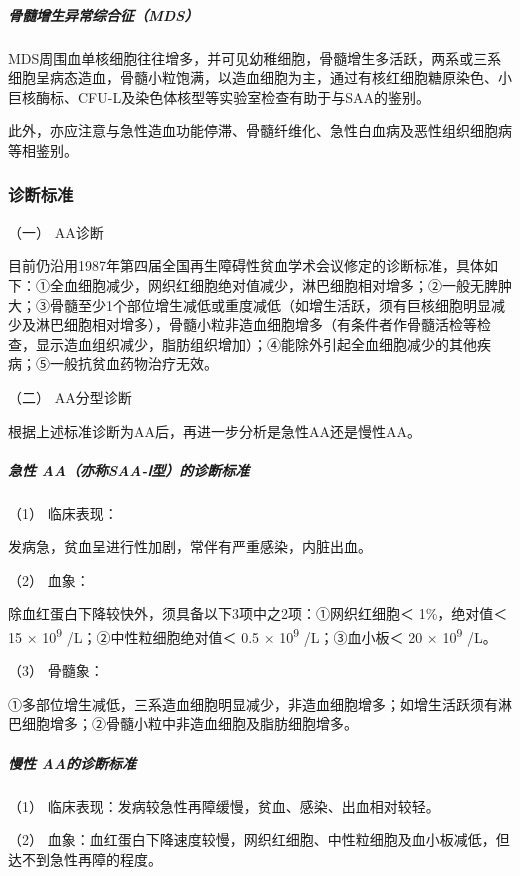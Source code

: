 \subparagraph{骨髓增生异常综合征（MDS）}

MDS周围血单核细胞往往增多，并可见幼稚细胞，骨髓增生多活跃，两系或三系细胞呈病态造血，骨髓小粒饱满，以造血细胞为主，通过有核红细胞糖原染色、小巨核酶标、CFU-L及染色体核型等实验室检查有助于与SAA的鉴别。

此外，亦应注意与急性造血功能停滞、骨髓纤维化、急性白血病及恶性组织细胞病等相鉴别。

\subsubsection{诊断标准}

\hypertarget{text00089.htmlux5cux23CHP3-10-1-2-4-1}{}
（一） AA诊断

目前仍沿用1987年第四届全国再生障碍性贫血学术会议修定的诊断标准，具体如下：①全血细胞减少，网织红细胞绝对值减少，淋巴细胞相对增多；②一般无脾肿大；③骨髓至少1个部位增生减低或重度减低（如增生活跃，须有巨核细胞明显减少及淋巴细胞相对增多），骨髓小粒非造血细胞增多（有条件者作骨髓活检等检查，显示造血组织减少，脂肪组织增加）；④能除外引起全血细胞减少的其他疾病；⑤一般抗贫血药物治疗无效。

\hypertarget{text00089.htmlux5cux23CHP3-10-1-2-4-2}{}
（二） AA分型诊断

根据上述标准诊断为AA后，再进一步分析是急性AA还是慢性AA。

\subparagraph{急性 AA（亦称SAA-Ⅰ型）的诊断标准}

\hypertarget{text00089.htmlux5cux23CHP3-10-1-2-4-2-1-1}{}
（1） 临床表现：

发病急，贫血呈进行性加剧，常伴有严重感染，内脏出血。

\hypertarget{text00089.htmlux5cux23CHP3-10-1-2-4-2-1-2}{}
（2） 血象：

除血红蛋白下降较快外，须具备以下3项中之2项：①网织红细胞＜ 1\%，绝对值＜
15 × 10\textsuperscript{9} /L；②中性粒细胞绝对值＜ 0.5 ×
10\textsuperscript{9} /L；③血小板＜ 20 × 10\textsuperscript{9} /L。

\hypertarget{text00089.htmlux5cux23CHP3-10-1-2-4-2-1-3}{}
（3） 骨髓象：

①多部位增生减低，三系造血细胞明显减少，非造血细胞增多；如增生活跃须有淋巴细胞增多；②骨髓小粒中非造血细胞及脂肪细胞增多。

\subparagraph{慢性 AA的诊断标准}

（1） 临床表现：发病较急性再障缓慢，贫血、感染、出血相对较轻。

（2）
血象：血红蛋白下降速度较慢，网织红细胞、中性粒细胞及血小板减低，但达不到急性再障的程度。

